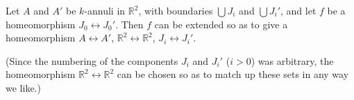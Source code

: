 Let $A$ and $A'$ be $k$-annuli in $\mathbb{R}^2$, with boundaries $\bigcup J_i$ and $\bigcup J_i'$, and let $f$ be a homeomorphism $J_0 \leftrightarrow J_0'$. Then $f$ can be extended so as to give a homeomorphism $A \leftrightarrow A'$, $\mathbb{R}^2 \leftrightarrow \mathbb{R}^2$, $J_i \leftrightarrow J_i'$.

(Since the numbering of the components $J_i$ and $J_i'$ ($i > 0$) was arbitrary, the homeomorphism $\mathbb{R}^2 \leftrightarrow \mathbb{R}^2$ can be chosen so as to match up these sets in any way we like.)
